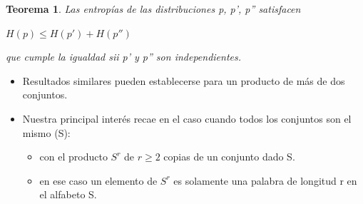\documentclass{beamer}
\theoremstyle{plain}
\newtheorem{teorema} [Teorema] {Teorema}
\theoremstyle{example}
\theoremstyle{example}
\begin{document}
\begin{frame}  \small 

\begin{teorema}\label{theorem:inegualdadInd}
Las entropías de las distribuciones p, p', p'' satisfacen 

\begin{center}$H(p) \leq H(p')+H(p'')$\end{center}
que cumple la igualdad sii p' y p'' son independientes. 

\end{teorema}
\begin{itemize}
\item 
Resultados similares pueden establecerse para un producto de más de dos conjuntos.
\item 
Nuestra principal interés recae en el caso cuando todos los conjuntos son el mismo (S): 
	\begin{itemize}
        \item con el producto $S^{r}$ de $r\geq 2$ copias de un conjunto dado S.
		\item en ese caso un elemento de $S^{r}$ es solamente una palabra de longitud r en el alfabeto S.
	\end{itemize}

\end{itemize}

\end{frame} 
\end{document}
